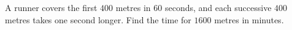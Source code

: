 A runner covers the first $400$ metres in $60$ seconds, and each successive $400$ metres takes one second longer. Find the time for $1600$ metres in minutes.
